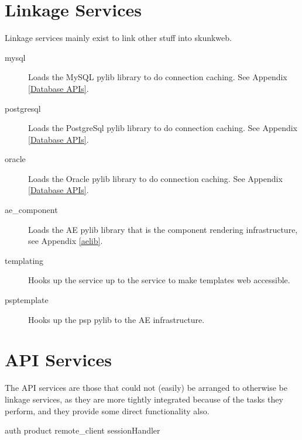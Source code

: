 \documentclass{manual}
\begin{document}
\section{Linkage Services}
Linkage services mainly exist to link other stuff into skunkweb.
\begin{description}
\item[mysql] Loads the  MySQL pylib library to do
connection caching.  See Appendix \ref{Database APIs}.
\item[postgresql] Loads the  PostgreSql pylib
library to do connection caching.  See Appendix \ref{Database APIs}.
\item[oracle] Loads the Oracle  pylib library to do
connection caching.  See Appendix \ref{Database APIs}.
\item[ae_component] Loads the AE pylib library that is the component
rendering infrastructure, see Appendix \ref{aelib}.
\item[templating] Hooks up the  service up to
the  service to make templates web accessible.
\item[psptemplate] Hooks up the psp pylib to the AE infrastructure.
\end{description}


\section{API Services}
The API services are those that could not (easily) be arranged to
otherwise be linkage services, as they are more tightly integrated
because of the tasks they perform, and they provide some direct
functionality also.

       auth
       product 
       remote\_client
       sessionHandler
\end{document}
